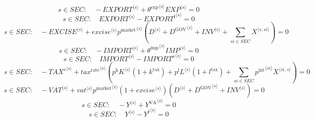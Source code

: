\begin{equation}
s\in {S\!E\!C}\colon\quad -{{E\!X\!P\!O\!R\!T}}^{\langle s\rangle} + {{\theta^{\mathrm{exp}}}^{\langle s\rangle}} {{{E\!X\!P}}^{\langle s\rangle}} = 0
\end{equation}
\begin{equation}
s\in {S\!E\!C}\colon\quad {{E\!X\!P\!O\!R\!T}}^{\langle s\rangle} - {{E\!X\!P\!O\!R\!T}^{\mathrm{f}}}^{\langle s\rangle} = 0
\end{equation}
\begin{equation}
s\in {S\!E\!C}\colon\quad -{{E\!X\!C\!I\!S\!E}}^{\langle s\rangle} + {{{e\!x\!c\!i\!s\!e}}^{\langle s\rangle}} {{p^{\mathrm{market}}}^{\langle s\rangle}} \left({D}^{\langle s\rangle} + {D^{\mathrm{GOV}}}^{\langle s\rangle} + {{I\!N\!V}}^{\langle s\rangle} + \sum_{{s\!i}\in {S\!E\!C}} {X}^{\langle s,{s\!i}\rangle}\right) = 0
\end{equation}
\begin{equation}
s\in {S\!E\!C}\colon\quad -{{I\!M\!P\!O\!R\!T}}^{\langle s\rangle} + {{\theta^{\mathrm{imp}}}^{\langle s\rangle}} {{{I\!M\!P}}^{\langle s\rangle}} = 0
\end{equation}
\begin{equation}
s\in {S\!E\!C}\colon\quad {{I\!M\!P\!O\!R\!T}}^{\langle s\rangle} - {{I\!M\!P\!O\!R\!T}^{\mathrm{a}}}^{\langle s\rangle} = 0
\end{equation}
\begin{equation}
s\in {S\!E\!C}\colon\quad -{{T\!A\!X}^{\mathrm{s}}}^{\langle s\rangle} + {{{t\!a\!x}^{\mathrm{rate}}}^{\langle s\rangle}} \left({p^{\mathrm{k}}} {{K}^{\langle s\rangle}} \left(1 + k^{\mathrm{tax}}\right) + {p^{\mathrm{l}}} {{L}^{\langle s\rangle}} \left(1 + l^{\mathrm{tax}}\right) + \sum_{{s\!i}\in {S\!E\!C}} {{p^{\mathrm{int}}}^{\langle {s\!i}\rangle}} {{X}^{\langle {s\!i},s\rangle}}\right) = 0
\end{equation}
\begin{equation}
s\in {S\!E\!C}\colon\quad -{{V\!A\!T}}^{\langle s\rangle} + {{{v\!a\!t}}^{\langle s\rangle}} {{p^{\mathrm{market}}}^{\langle s\rangle}} \left(1 + {{e\!x\!c\!i\!s\!e}}^{\langle s\rangle}\right) \left({D}^{\langle s\rangle} + {D^{\mathrm{GOV}}}^{\langle s\rangle} + {{I\!N\!V}}^{\langle s\rangle}\right) = 0
\end{equation}
\begin{equation}
s\in {S\!E\!C}\colon\quad -{Y}^{\langle s\rangle} + {Y^{\mathrm{VA}}}^{\langle s\rangle} = 0
\end{equation}
\begin{equation}
s\in {S\!E\!C}\colon\quad {Y}^{\langle s\rangle} - {Y^{\mathrm{f}}}^{\langle s\rangle} = 0
\end{equation}
